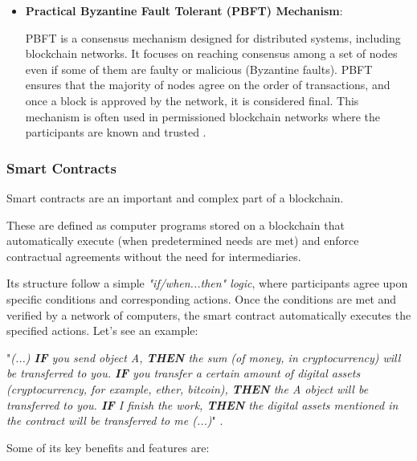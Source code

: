 \begin{itemize}
    \item \textbf{Practical Byzantine Fault Tolerant (PBFT) Mechanism}: 
    
    PBFT is a consensus mechanism designed for distributed systems, including blockchain networks. It focuses on reaching consensus among a set of nodes even if some of them are faulty or malicious (Byzantine faults). PBFT ensures that the majority of nodes agree on the order of transactions, and once a block is approved by the network, it is considered final. This mechanism is often used in permissioned blockchain networks where the participants are known and trusted \cite{hack}.

\end{itemize}

\subsubsection{Smart Contracts}\label{sc}

Smart contracts are an important and complex part of a blockchain.

These are defined as computer programs stored on a blockchain that automatically execute (when predetermined needs are met) and enforce contractual agreements without the need for intermediaries.

Its structure follow a simple \textit{"if/when...then" logic}, where participants agree upon specific conditions and corresponding actions.
Once the conditions are met and verified by a network of computers, the smart contract automatically executes the specified actions. Let's see an example:\newline

"\textit{(...) \textbf{IF} you send object A, \textbf{THEN} the sum (of money, in cryptocurrency) will be transferred to you.
\textbf{IF} you transfer a certain amount of digital assets (cryptocurrency, for example, ether, bitcoin), \textbf{THEN} the A object will be transferred to you.
\textbf{IF} I finish the work, \textbf{THEN} the digital assets mentioned in the contract will be transferred to me (...)}" \cite{sc}.\newline

Some of its key benefits and features are:

